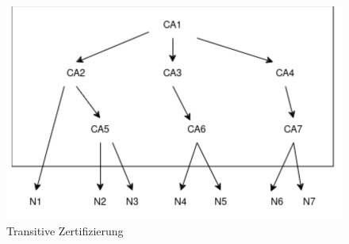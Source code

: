 \begin{figure}
  \centering
  \includegraphics[width=.6\textwidth]{res/2023-1.png}
  \caption{Transitive Zertifizierung}
  \label{fig:zertifizierung}
\end{figure}
